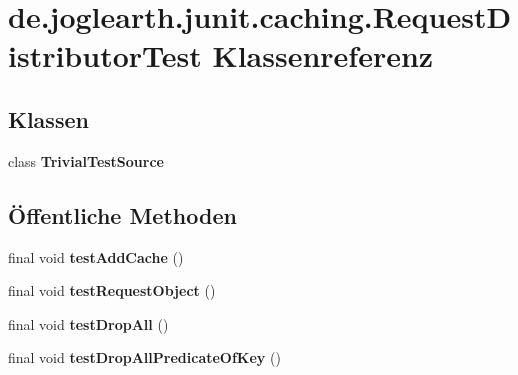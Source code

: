 \section{de.\-joglearth.\-junit.\-caching.\-Request\-Distributor\-Test Klassenreferenz}
\label{classde_1_1joglearth_1_1junit_1_1caching_1_1_request_distributor_test}
\subsection*{Klassen}
\begin{DoxyCompactItemize}
\item 
class {\bfseries Trivial\-Test\-Source}
\end{DoxyCompactItemize}
\subsection*{Öffentliche Methoden}
\begin{DoxyCompactItemize}
\item 
final void {\bfseries test\-Add\-Cache} ()\label{classde_1_1joglearth_1_1junit_1_1caching_1_1_request_distributor_test_adeee63b1ca81db52126167b5058dcb7b}

\item 
final void {\bfseries test\-Request\-Object} ()\label{classde_1_1joglearth_1_1junit_1_1caching_1_1_request_distributor_test_ad0548b66c94e0da6b0cc04f3679d1604}

\item 
final void {\bfseries test\-Drop\-All} ()\label{classde_1_1joglearth_1_1junit_1_1caching_1_1_request_distributor_test_aa8be485c94d98e2a2348f514349e1386}

\item 
final void {\bfseries test\-Drop\-All\-Predicate\-Of\-Key} ()\label{classde_1_1joglearth_1_1junit_1_1caching_1_1_request_distributor_test_a6f513d9ed90b5378c6dc9cfa79665215}

\end{DoxyCompactItemize}
